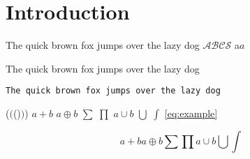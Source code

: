 \chapter{Introduction}

\noindent The quick brown fox jumps over the lazy dog $\mathscr{ABCS}$ a$a$

\noindent\textsf{The quick brown fox jumps over the lazy dog}

\noindent\texttt{The quick brown fox jumps over the lazy dog}

($($()$)$) $a + b$ $a \oplus b$ $\sum$ $\prod$ $a \cup b$ $\bigcup$ $\int$ \cref{eq:example}

\begin{equation}
a + b a \oplus b \sum \prod a \cup b \bigcup \int \label{eq:example}
\end{equation}

\begin{dfn}
  \blindtext[1]
\end{dfn}

\Blindtext[2][1]

